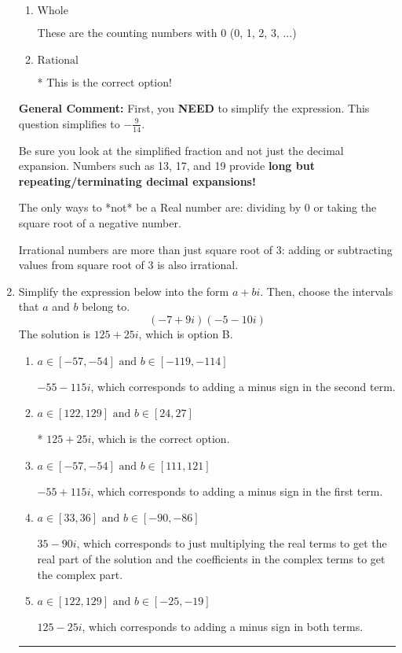 \documentclass{extbook}[14pt]
\newcommand{\litem}[1]{\item #1

\rule{\textwidth}{0.4pt}}
\begin{document}
\begin{enumerate}
{\begin{enumerate}[label=\Alph*.]
These are the negative and positive counting numbers (..., -3, -2, -1, 0, 1, 2, 3, ...)
\item \( \text{Whole} \)

These are the counting numbers with 0 (0, 1, 2, 3, ...)
\item \( \text{Rational} \)

* This is the correct option!
\end{enumerate}

\textbf{General Comment:} First, you \textbf{NEED} to simplify the expression. This question simplifies to $-\frac{9}{14}$. 
 
 Be sure you look at the simplified fraction and not just the decimal expansion. Numbers such as 13, 17, and 19 provide \textbf{long but repeating/terminating decimal expansions!} 
 
 The only ways to *not* be a Real number are: dividing by 0 or taking the square root of a negative number. 
 
 Irrational numbers are more than just square root of 3: adding or subtracting values from square root of 3 is also irrational.
}
\litem{
Simplify the expression below into the form $a+bi$. Then, choose the intervals that $a$ and $b$ belong to.
\[ (-7 + 9 i)(-5 - 10 i) \]The solution is \( 125 + 25 i \), which is option B.\begin{enumerate}[label=\Alph*.]
\item \( a \in [-57, -54] \text{ and } b \in [-119, -114] \)

 $-55 - 115 i$, which corresponds to adding a minus sign in the second term.
\item \( a \in [122, 129] \text{ and } b \in [24, 27] \)

* $125 + 25 i$, which is the correct option.
\item \( a \in [-57, -54] \text{ and } b \in [111, 121] \)

 $-55 + 115 i$, which corresponds to adding a minus sign in the first term.
\item \( a \in [33, 36] \text{ and } b \in [-90, -86] \)

 $35 - 90 i$, which corresponds to just multiplying the real terms to get the real part of the solution and the coefficients in the complex terms to get the complex part.
\item \( a \in [122, 129] \text{ and } b \in [-25, -19] \)

 $125 - 25 i$, which corresponds to adding a minus sign in both terms.
\end{enumerate}

}
\end{enumerate}
\end{document}
